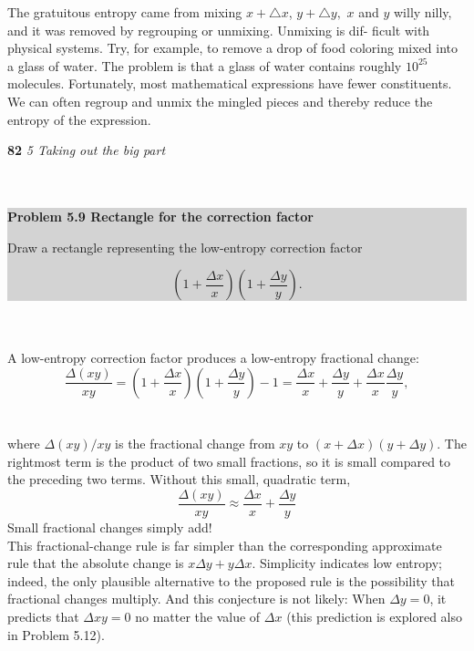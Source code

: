 \documentclass{book}
\begin{document}
\large{The gratuitous entropy came from mixing $x+\triangle x$, $y+\triangle y,$ $x$ and $y$ willy
nilly, and it was removed by regrouping or unmixing. Unmixing is dif-
ficult with physical systems. Try, for example, to remove a drop of food
coloring mixed into a glass of water. The problem is that a glass of
water contains roughly $10^{25}$ molecules. Fortunately, most mathematical
expressions have fewer constituents. We can often regroup and unmix
the mingled pieces and thereby reduce the entropy of the expression.}

\newpage
 \large\textbf{82} \hfill \textit{5 Taking out the big part} \\ 
\vspace{0pt} 
\\
\\
\colorbox{lightgray}{
\begin{minipage}{\textwidth}
 {\large\textbf{Problem 5.9 Rectangle for the correction factor}
 
Draw a rectangle representing the low-entropy correction factor}
 \begin{equation}
 (1+\frac{\Delta x}{x})(1+\frac{\Delta y}{y}).
 \end{equation}
\end{minipage}}
\\
\\
\large{A low-entropy correction factor produces a low-entropy fractional change:
\begin{equation}
\frac{\Delta (xy)}{xy}=(1+\frac{\Delta x}{x})(1+\frac{\Delta y}{y})-1=\frac{\Delta x}{x}+\frac{\Delta y}{y}+\frac{\Delta x}{x}\frac{\Delta y}{y},
\end{equation}
\\
\\
where $\Delta (xy)/xy$ is the fractional change from $xy$ to $(x+\Delta x)(y+\Delta y)$.
The rightmost term is the product of two small fractions, so it is small
compared to the preceding two terms. Without this small, quadratic term,}
\begin{equation}
\frac{\Delta (xy)}{xy}\approx\frac{\Delta x}{x}+\frac{\Delta y}{y}
\end{equation}
\large{Small fractional changes simply add!
\\

This fractional-change rule is far simpler than the corresponding approximate
rule that the absolute change is $x\Delta y+y\Delta x$. Simplicity indicates
low entropy; indeed, the only plausible alternative to the proposed rule
is the possibility that fractional changes multiply. And this conjecture is
not likely: When $\Delta y=0$, it predicts that $\Delta xy=0$ no matter the value
of $\Delta x$ (this prediction is explored also in Problem 5.12).}
\\
\end{document}
